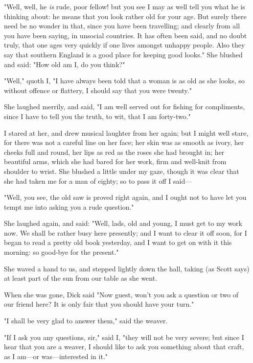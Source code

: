"Well, well, he \emph{is} rude, poor fellow! but you see I may as well
tell you what he is thinking about: he means that you look rather old
for your age. But surely there need be no wonder in that, since you have
been travelling; and clearly from all you have been saying, in unsocial
countries. It has often been said, and no doubt truly, that one ages
very quickly if one lives amongst unhappy people. Also they say that
southern England is a good place for keeping good looks." She blushed
and said: "How old am I, do you think?"

"Well," quoth I, "I have always been told that a woman is as old as she
looks, so without offence or flattery, I should say that you were
twenty."

She laughed merrily, and said, "I am well served out for fishing for
compliments, since I have to tell you the truth, to wit, that I am
forty-two."

I stared at her, and drew musical laughter from her again; but I might
well stare, for there was not a careful line on her face; her skin was
as smooth as ivory, her cheeks full and round, her lips as red as the
roses she had brought in; her beautiful arms, which she had bared for
her work, firm and well-knit from shoulder to wrist. She blushed a
little under my gaze, though it was clear that she had taken me for a
man of eighty; so to pass it off I said---

"Well, you see, the old saw is proved right again, and I ought not to
have let you tempt me into asking you a rude question."

She laughed again, and said: "Well, lads, old and young, I must get to
my work now. We shall be rather busy here presently; and I want to clear
it off soon, for I began to read a pretty old book yesterday, and I want
to get on with it this morning: so good-bye for the present."

She waved a hand to us, and stepped lightly down the hall, taking (as
Scott says) at least part of the sun from our table as she went.

When she was gone, Dick said "Now guest, won't you ask a question or two
of our friend here? It is only fair that you should have your turn."

"I shall be very glad to answer them," said the weaver.

"If I ask you any questions, sir," said I, "they will not be very
severe; but since I hear that you are a weaver, I should like to ask you
something about that craft, as I am---or was---interested in it."

